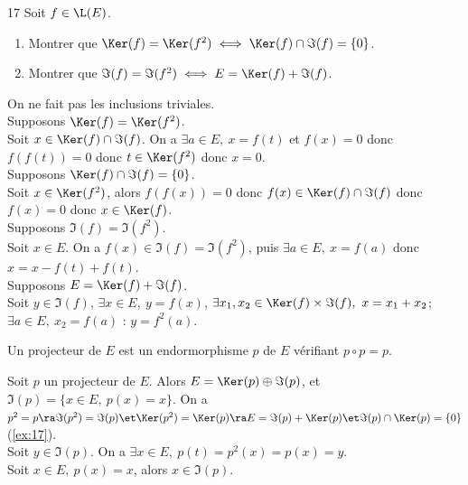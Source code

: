\documentclass[11pt]{article}
\begin{document}
\begin{ex}{}{17}
    Soit $f\in\L(E)$.
    \begin{enumerate}
        \item Montrer que $\Ker(f)=\Ker(f^2)\iff\Ker(f)\cap\Im(f)=\{0\}$.
        \item Montrer que $\Im(f)=\Im(f^2)\iff E=\Ker(f)+\Im(f)$.
    \end{enumerate}
    \tcblower
    On ne fait pas les inclusions triviales.\\
     Supposons $\Ker(f)=\Ker(f^2)$.\\
    \boxed{\subset} Soit $x\in\Ker(f)\cap\Im(f)$. On a $\exists a \in E, ~ x=f(t)$ et $f(x)=0$ donc $f(f(t))=0$ donc $t\in\Ker(f^2)$ donc $x=0$.\\
     Supposons $\Ker(f)\cap\Im(f)=\{0\}$.\\
    \boxed{\supset} Soit $x\in\Ker(f^2)$, alors $f(f(x))=0$ donc $f(x)\in\Ker(f)\cap\Im(f)$ donc $f(x)=0$ donc $x\in\Ker(f)$.\\
     Supposons $\Im(f)=\Im(f^2)$.\\
    \boxed{\subset} Soit $x\in E$. On a $f(x)\in\Im(f)=\Im(f^2)$, puis $\exists a \in E, ~ x=f(a)$ donc $x=x-f(t)+f(t)$.\\
     Supposons $E=\Ker(f)+\Im(f)$.\\
    \boxed{\subset} Soit $y\in\Im(f)$, $\exists x \in E, ~ y=f(x)$, $\exists x_1,x_2\in\Ker(f)\times\Im(f), ~ x=x_1+x_2$; $\exists a \in E, ~ x_2 = f(a)$ : $y=f^2(a)$. 
\end{ex}

\vspace*{-0.7cm}

\begin{defi}{}{}
    Un projecteur de $E$ est un endormorphisme $p$ de $E$ vérifiant $p\circ p = p$.
\end{defi}

\vspace*{-0.7cm}

\begin{prop}{}{}
    Soit $p$ un projecteur de $E$. Alors $E=\Ker(p)\oplus\Im(p)$, et $\Im(p)=\{x\in E, ~ p(x)=x\}$.
    \tcblower
    On a $p^2=p\ra\Im(p^2)=\Im(p)\et\Ker(p^2)=\Ker(p)\ra E=\Im(p)+\Ker(p)\et\Im(p)\cap\Ker(p)=\{0\}$ (\ref{ex:17}).\\
    \boxed{\subset} Soit $y\in\Im(p)$. On a $\exists x\in E, ~ p(t)=p^2(x)=p(x)=y$.\\
    \boxed{\supset} Soit $x\in E, ~ p(x)=x$, alors $x\in\Im(p)$.
\end{prop}
\end{document}
